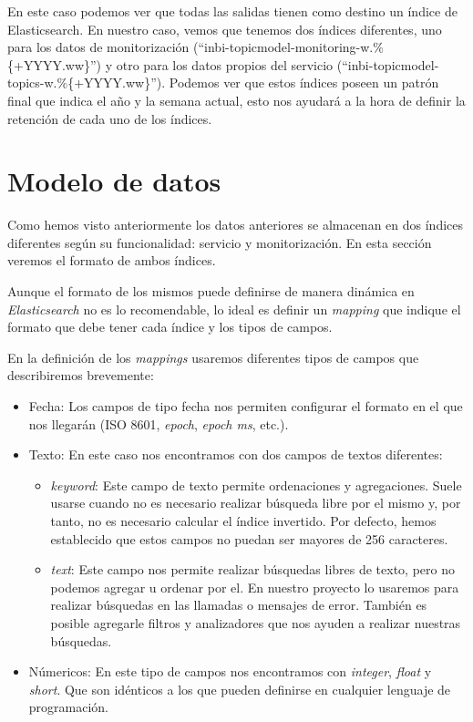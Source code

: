 En este caso podemos ver que todas las salidas tienen como destino un índice de Elasticsearch. En nuestro caso, vemos que tenemos dos índices diferentes, uno para los datos de monitorización (``inbi-topicmodel-monitoring-w.\%\{+YYYY.ww\}'') y otro para los datos propios del servicio (``inbi-topicmodel-topics-w.\%\{+YYYY.ww\}''). Podemos ver que estos índices poseen un patrón final que indica el año y la semana actual, esto nos ayudará a la hora de definir la retención de cada uno de los índices.

\section{Modelo de datos}

Como hemos visto anteriormente los datos anteriores se almacenan en dos índices diferentes según su funcionalidad: servicio y monitorización. En esta sección veremos el formato de ambos índices. 

Aunque el formato de los mismos puede definirse de manera dinámica en \textit{Elasticsearch} no es lo recomendable, lo ideal es definir un \textit{mapping} que indique el formato que debe tener cada índice y los tipos de campos. 


En la definición de los \textit{mappings} usaremos diferentes tipos de campos que describiremos brevemente: 

\begin{itemize}
\item Fecha: Los campos de tipo fecha nos permiten configurar el formato en el que nos llegarán (ISO 8601, \textit{epoch}, \textit{epoch ms}, etc.).
\item Texto: En este caso nos encontramos con dos campos de textos diferentes: 
\begin{itemize}
\item \textit{keyword}: Este campo de texto permite ordenaciones y agregaciones. Suele usarse cuando no es necesario realizar búsqueda libre por el mismo y, por tanto, no es necesario calcular el índice invertido. Por defecto, hemos establecido que estos campos no puedan ser mayores de 256 caracteres. 
 
\item \textit{text}: Este campo nos permite realizar búsquedas libres de texto, pero no podemos agregar u ordenar por el. En nuestro proyecto lo usaremos para realizar búsquedas en las llamadas o mensajes de error. También es posible agregarle filtros y analizadores que nos ayuden a realizar nuestras búsquedas.
\end{itemize}


\item Númericos: En este tipo de campos nos encontramos con \textit{integer}, \textit{float} y \textit{short}. Que son idénticos a los que pueden definirse en cualquier lenguaje de programación.
\end{itemize}


